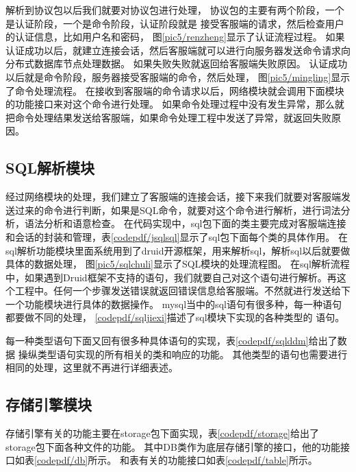 解析到协议包以后我们就要对协议包进行处理，
协议包的主要有两个阶段，一个是认证阶段，一个是命令阶段，认证阶段就是
接受客服端的请求，然后检查用户的认证信息，比如用户名和密码，
图\ref{pic5/renzheng}显示了认证流程过程。
如果认证成功以后，就建立连接会话，然后客服端就可以进行向服务器发送命令请求向分布式数据库节点处理数据。
如果失败失败就返回给客服端失败原因。
认证成功以后就是命令阶段，服务器接受客服端的命令，然后处理，
图\ref{pic5/mingling}显示了命令处理流程。
在接收到客服端的命令请求以后，网络模块就会调用下面模块的功能接口来对这个命令进行处理。
如果命令处理过程中没有发生异常，那么就把命令处理结果发送给客服端，如果命令处理工程中发送了异常，就返回失败原因。
\subsection{SQL解析模块}
经过网络模块的处理，我们建立了客服端的连接会话，接下来我们就要对客服端发送过来的命令进行判断，如果是SQL命令，就要对这个命令进行解析，进行词法分析，语法分析和语意检查。
在代码实现中，sql包下面的类主要完成对客服端连接和会话的封装和管理，表\ref{codepdf/jsqlsql}显示了sql包下面每个类的具体作用。
在sql解析功能模块里面系统用到了druid开源框架，用来解析sql，解析sql以后就要做具体的数据处理，
图\ref{pic5/sqlchuli}显示了SQL模块的处理流程图。
在sql解析流程中，如果遇到Druid框架不支持的语句，我们就要自己对这个语句进行解析。再这个工程中。任何一个步骤发送错误就返回错误信息给客服端。不然就进行发送给下一个功能模块进行具体的数据操作。
mysql当中的sql语句有很多种，每一种语句都要做不同的处理，
\ref{codepdf/sqljiexi}描述了sql模块下实现的各种类型的
语句。

每一种类型语句下面又回有很多种具体语句的实现，表\ref{codepdf/sqlddm}给出了数据
操纵类型语句实现的所有相关的类和响应的功能。
其他类型的语句也需要进行相同的处理，这里就不再进行详细表述。
\subsection{存储引擎模块}
存储引擎有关的功能主要在storage包下面实现，表\ref{codepdf/storage}给出了
storage包下面各种文件的功能。
其中DB类作为底层存储引擎的接口，他的功能接口如表\ref{codepdf/db}所示。
和表有关的功能接口如表\ref{codepdf/table}所示。


